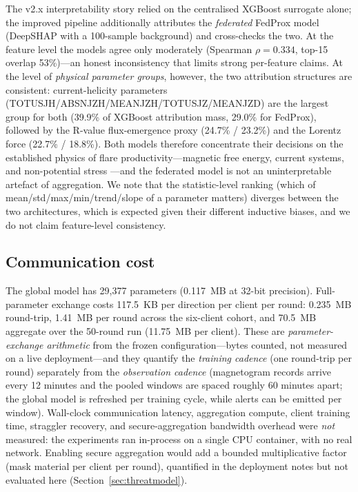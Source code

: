 The v2.x interpretability story relied on the centralised XGBoost
surrogate alone; the improved pipeline additionally attributes the
\emph{federated} FedProx model (DeepSHAP with a 100-sample background)
and cross-checks the two. At the feature level the models agree only
moderately (Spearman $\rho = 0.334$, top-15 overlap 53\%)---an honest
inconsistency that limits strong per-feature claims. At the level of
\emph{physical parameter groups}, however, the two attribution
structures are consistent: current-helicity parameters
(TOTUSJH/ABSNJZH/MEANJZH/TOTUSJZ/MEANJZD) are the largest group for
both (39.9\% of XGBoost attribution mass, 29.0\% for FedProx), followed
by the R-value flux-emergence proxy (24.7\% / 23.2\%) and the Lorentz
force (22.7\% / 18.8\%). Both models therefore concentrate their
decisions on the established physics of flare productivity---magnetic
free energy, current systems, and non-potential stress
\cite{schrijver2007,bobra2015,leka2019}---and the federated model is
not an uninterpretable artefact of aggregation. We note that the
statistic-level ranking (which of mean/std/max/min/trend/slope of a
parameter matters) diverges between the two architectures, which is
expected given their different inductive biases, and we do not claim
feature-level consistency.

\subsection{Communication cost}
\label{sec:res-comm}

The global model has 29{,}377 parameters (0.117~MB at 32-bit
precision). Full-parameter exchange costs 117.5~KB per direction per
client per round: 0.235~MB round-trip, 1.41~MB per round across the
six-client cohort, and 70.5~MB aggregate over the 50-round run
(11.75~MB per client). These are \emph{parameter-exchange arithmetic}
from the frozen configuration---bytes counted, not measured on a live
deployment---and they quantify the \emph{training cadence} (one
round-trip per round) separately from the \emph{observation cadence}
(magnetogram records arrive every 12 minutes and the pooled windows
are spaced roughly 60 minutes apart; the global model
is refreshed per training cycle, while alerts can be emitted per
window). Wall-clock communication latency, aggregation compute,
client training time, straggler recovery, and secure-aggregation
bandwidth overhead were \emph{not} measured: the experiments ran
in-process on a single CPU container, with no real network. Enabling
secure aggregation would add a bounded multiplicative factor (mask
material per client per round), quantified in the deployment notes but
not evaluated here (Section~\ref{sec:threatmodel}).

